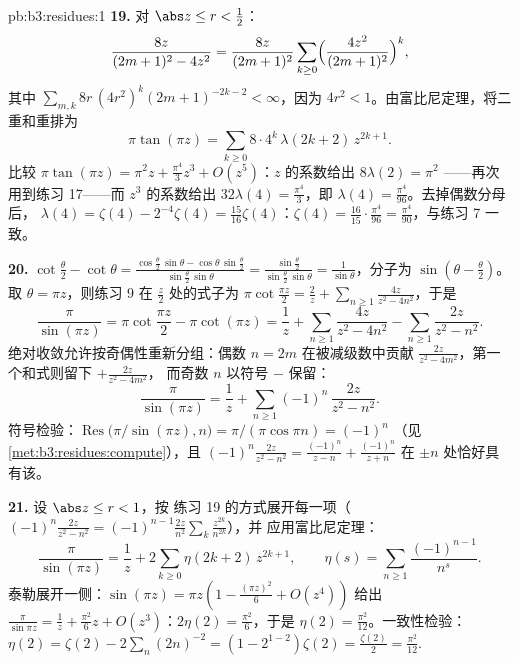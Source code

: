 \begin{solution}{pb:b3:residues:1}
\textbf{19.} 对 $\abs z \leq r < \frac12$：
\[
\frac{8z}{(2m+1)^2 - 4z^2} = \frac{8z}{(2m+1)^2}
\sum_{k\geq0}\Bigl(\frac{4z^2}{(2m+1)^2}\Bigr)^{k},
\]
其中 $\sum_{m,k}8r\,(4r^2)^k(2m+1)^{-2k-2} < \infty$，因为
$4r^2 < 1$。由富比尼定理，将二重和重排为
\[
\pi\tan(\pi z) =
\sum_{k\geq0}8\cdot4^k\,\lambda(2k+2)\,z^{2k+1} .
\]
比较 $\pi\tan(\pi z) = \pi^2z + \frac{\pi^4}3z^3 +
O(z^5)$：$z$ 的系数给出 $8\lambda(2) = \pi^2$
——再次用到练习 17——而 $z^3$ 的系数给出
$32\lambda(4) = \frac{\pi^4}3$，即 $\lambda(4) =
\frac{\pi^4}{96}$。去掉偶数分母后，
$\lambda(4) = \zeta(4) - 2^{-4}\zeta(4) =
\frac{15}{16}\zeta(4)$：$\zeta(4) = \frac{16}{15}\cdot
\frac{\pi^4}{96} = \frac{\pi^4}{90}$，与练习 7 一致。

\textbf{20.} $\cot\frac\theta2 - \cot\theta =
\frac{\cos\frac\theta2\,\sin\theta -
\cos\theta\,\sin\frac\theta2}{\sin\frac\theta2\,\sin\theta}
= \frac{\sin\frac\theta2}{\sin\frac\theta2\,\sin\theta} =
\frac1{\sin\theta}$，分子为 $\sin(\theta -
\frac\theta2)$。取 $\theta = \pi z$，则练习 9 在
$\frac z2$ 处的式子为 $\pi\cot\frac{\pi z}2 = \frac2z +
\sum_{n\geq1}\frac{4z}{z^2 - 4n^2}$，于是
\[
\frac{\pi}{\sin(\pi z)}
= \pi\cot\frac{\pi z}2 - \pi\cot(\pi z)
= \frac1z + \sum_{n\geq1}\frac{4z}{z^2 - 4n^2}
- \sum_{n\geq1}\frac{2z}{z^2 - n^2} .
\]
绝对收敛允许按奇偶性重新分组：偶数 $n
= 2m$ 在被减级数中贡献
$\frac{2z}{z^2-4m^2}$，第一个和式则留下 $+\frac{2z}{z^2-4m^2}$，
而奇数 $n$ 以符号 $-$ 保留：
\[
\frac{\pi}{\sin(\pi z)} = \frac1z +
\sum_{n\geq1}(-1)^n\,\frac{2z}{z^2 - n^2} .
\]
符号检验：$\operatorname{Res}\bigl(\pi/\sin(\pi z),
n\bigr) = \pi/(\pi\cos\pi n) = (-1)^n$
（见\cref{met:b3:residues:compute}），且 $(-1)^n\frac{2z}{z^2 -
n^2} = \frac{(-1)^n}{z-n} + \frac{(-1)^n}{z+n}$ 在
$\pm n$ 处恰好具有该。

\textbf{21.} 设 $\abs z \leq r < 1$，按
练习 19 的方式展开每一项（$(-1)^n\frac{2z}{z^2-n^2} =
(-1)^{n-1}\frac{2z}{n^2}\sum_k\frac{z^{2k}}{n^{2k}}$），并
应用富比尼定理：
\[
\frac{\pi}{\sin(\pi z)} = \frac1z +
2\sum_{k\geq0}\eta(2k+2)\,z^{2k+1},
\qquad
\eta(s) = \sum_{n\geq1}\frac{(-1)^{n-1}}{n^s} .
\]
泰勒展开一侧：$\sin(\pi z) = \pi z(1 - \frac{(\pi z)^2}6 +
O(z^4))$ 给出 $\frac\pi{\sin\pi z} = \frac1z +
\frac{\pi^2}6z + O(z^3)$：$2\eta(2) = \frac{\pi^2}6$，于是
$\eta(2) = \frac{\pi^2}{12}$。一致性检验：$\eta(2) =
\zeta(2) - 2\sum_n(2n)^{-2} = (1 - 2^{1-2})\zeta(2) =
\frac{\zeta(2)}2 = \frac{\pi^2}{12}$.


\end{solution}
